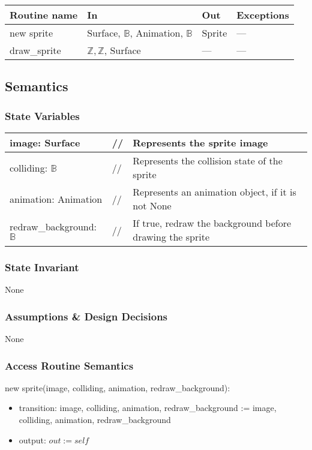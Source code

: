 \documentclass[12pt]{article}
\begin{document}
\begin{tabular}{| l | l | l | l |}
\hline
\textbf{Routine name} & \textbf{In} & \textbf{Out} & \textbf{Exceptions}\\
\hline
new sprite & Surface, $\mathbb{B}$, Animation, $\mathbb{B}$ & Sprite & ---\\
\hline
draw\_sprite & $\mathbb{Z, Z}$, Surface & --- & ---\\
\hline
\end{tabular}

\subsection* {Semantics}

\subsubsection* {State Variables}
\begin{tabular}{lll}
\hline
image: Surface & // & Represents the sprite image\\
\hline
colliding: $\mathbb{B}$ & // & Represents the collision state of the sprite\\
\hline
animation: Animation & // & Represents an animation object, if it is not None\\
\hline
redraw\_background: $\mathbb{B}$ & // & If true, redraw the background before drawing the sprite\\
\end{tabular}

\subsubsection* {State Invariant}

None

\subsubsection* {Assumptions \& Design Decisions}

None

\subsubsection* {Access Routine Semantics}

new sprite(image, colliding, animation, redraw\_background):
\begin{itemize}
    \item transition: image, colliding, animation, redraw\_background := image, colliding, animation, redraw\_background
    \item output: $out := self$
\end{itemize}
\end{document}
